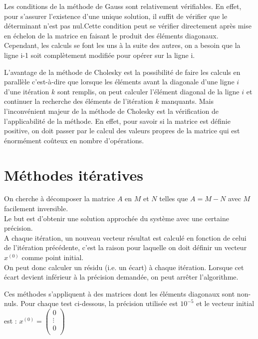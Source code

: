 \documentclass{report}
\begin{document}
    Les conditions de la méthode de Gauss sont relativement vérifiables. En effet, pour s'assurer l'existence d'une unique solution, il suffit de vérifier que le déterminant n'est pas nul.Cette condition peut se vérifier directement après mise en échelon de la matrice en faisant le produit des éléments diagonaux.
    Cependant, les calculs se font les uns à la suite des autres, on a besoin que la ligne i-1 soit complètement modifiée pour opérer sur la ligne i.

    
   L'avantage de la méthode de Cholesky est la possibilité de faire les calculs en parallèle c'est-à-dire que lorsque les éléments avant la diagonale d'une ligne $i$ d'une itération $k$ sont remplis, on peut calculer l'élément diagonal de la ligne $i$ et continuer la recherche des éléments de l'itération $k$ manquants.
    Mais l'inconvénient majeur de la méthode de Cholesky est la vérification de  l'applicabilité de la méthode. En effet, pour savoir si la matrice est définie positive, on doit passer par le calcul
    des valeurs propres de la matrice qui est énormément coûteux en nombre d'opérations.
    
     
  \chapter{Méthodes itératives}
      On cherche à décomposer la matrice $A$ en $M$ et $N$ telles que $A = M-N$ avec $M$ facilement inversible.\\
      
      Le but est d'obtenir une solution approchée du système avec une certaine précision.\\
      A chaque itération, un nouveau vecteur résultat est calculé en fonction de celui de l'itération précédente, c'est la raison pour laquelle on doit définir un vecteur $x^{(0)}$ comme point initial.\\
      On peut donc calculer un résidu (i.e. un écart) à chaque itération. Lorsque cet écart devient inférieur à la précision demandée, on peut arrêter l'algorithme.
      
      Ces méthodes s'appliquent à des matrices dont les éléments diagonaux sont non-nuls.
      Pour chaque test ci-dessous, la précision utilisée est $10^{-5}$ et le vecteur initial est :
      $x^{(0)} = \begin{pmatrix}
                    0 \\
                    \vdots \\
                    0 \\
                 \end{pmatrix}$
    \newpage
\end{document}
